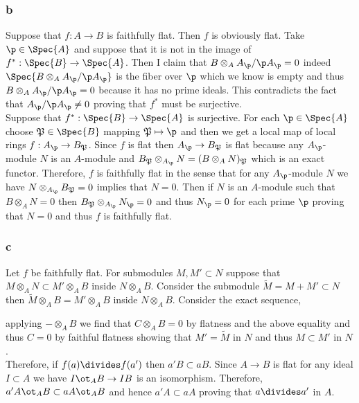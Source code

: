 \documentclass[12pt]{article}
\begin{document}
\subsubsection{b}

\renewcommand{\P}{\mathfrak{P}}

Suppose that $f : A \to B$ is faithfully flat. Then $f$ is obviously flat. Take $\p \in \Spec{A}$ and suppose that it is not in the image of $f^* : \Spec{B} \to \Spec{A}$. Then I claim that $B \otimes_A A_\p / \p A_\p = 0$ indeed $\Spec{B \otimes_A A_\p / \p A_\p}$ is the fiber over $\p$ which we know is empty and thus $B \otimes_A A_\p / \p A_\p = 0$ because it has no prime ideals. This contradicts the fact that $A_\p / \p A_\p \neq 0$ proving that $f^*$ must be surjective.
\bigskip\\
Suppose that $f^* : \Spec{B} \to \Spec{A}$ is surjective. For each $\p \in \Spec{A}$ choose $\P \in \Spec{B}$ mapping $\P \mapsto \p$ and then we get a local map of local rings $f : A_\p \to B_\P$. Since $f$ is flat then $A_\p \to B_\P$ is flat because any $A_\p$-module $N$ is an $A$-module and $B_\P \otimes_{A_\p} N = (B \otimes_A N)_\P$ which is an exact functor. Therefore, $f$ is faithfully flat in the sense that for any $A_\p$-module $N$ we have $N \otimes_{A_\p} B_\P = 0$ implies that $N = 0$. Then if $N$ is an $A$-module such that $B \otimes_A N = 0$ then $B_\P \otimes_{A_\p} N_\p = 0$ and thus $N_\p = 0$ for each prime $\p$ proving that $N = 0$ and thus $f$ is faithfully flat.

\subsubsection{c}

Let $f$ be faithfully flat. For submodules $M,M' \subset N$ suppose that $M \otimes_A N \subset M' \otimes_A B$ inside $N \otimes_A B$. Consider the submodule $\tilde{M} = M + M' \subset N$ then $\tilde{M} \otimes_A B = M' \otimes_A B$ inside $N \otimes_A B$. Consider the exact sequence,
\begin{center}
\end{center}
applying $- \otimes_A B$ we find that $C \otimes_A B = 0$ by flatness and the above equality and thus $C = 0$ by faithful flatness showing that $M' = \tilde{M}$ in $N$ and thus $M \subset M'$ in $N$.
\bigskip\\
Therefore, if $f(a) \divides f(a')$ then $a' B \subset a B$. Since $A \to B$ is flat for any ideal $I \subset A$ we have $I \ot_A B \to I B$  is an isomorphism. Therefore, $a' A \ot_A B \subset a A \ot_A B$ and hence $a' A \subset a A$ proving that $a \divides a'$ in $A$.
\end{document}
